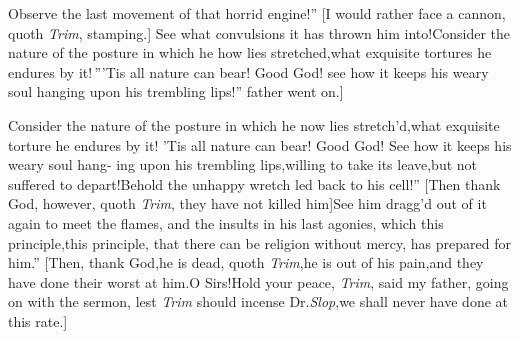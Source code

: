 \documentclass{article}
\begin{document}
\lqq Observe the last movement of that\break
\lqq horrid engine!” [I would rather face\break
a cannon, quoth \textit{Trim}, stamping.]\tsh\break
\lqq See what convulsions it has thrown\break
\lqq him into!\tsh Consider the nature of\break
\lqq the posture in which he how lies\break
\lqq stretched,\tsk what exquisite tortures he\break
\lqq endures by it!\,”\tsh [I hope ’tis not in\catch{\textit{Portugal}.]}
\textit{Portugal.}]\tsk \lqq ’Tis all nature can bear!\break
\lqq Good God! see how it keeps his weary\break
\lqq soul hanging upon his trembling lips!”\break
\stick{[I would not read another line of it,}
father went on.]

\lqq \tsk Consider the nature of the posture\break
\lqq in which he now lies stretch’d,\tsk what\break
\lqq exquisite torture he endures by it!\tsk\break
\lqq ’Tis all nature can bear! Good God!\break
\lqq See how it keeps his weary soul hang-\break
\lqq ing upon his trembling lips,\tsk willing\break
\lqq to take its leave,\tsh but not suffered\break
\lqq to depart!\tsk Behold the unhappy\break
\lqq wretch led back to his cell!” [Then\break
thank God, however, quoth \textit{Trim}, they\break
have not killed him]\tsk\lqq See him dragg’d\break
\lqq out of it again to meet the flames, and\break
\lqq the insults in his last agonies, which\break
\lqq this principle,\tsh this principle, that\break
\lqq there can be religion without mercy,\break
\lqq has prepared for him.” [Then, thank\break
God,\tsk he is dead, quoth \textit{Trim},\tsk he is
out of his pain,\tsk and they have
done their worst at him.\tsk O Sirs!\tsk Hold your peace,
\textit{Trim}, said my father, going on with the sermon, lest
\textit{Trim} should incense Dr.\@ \textit{Slop},\tsk we shall never
have done at this rate.]
\end{document}
